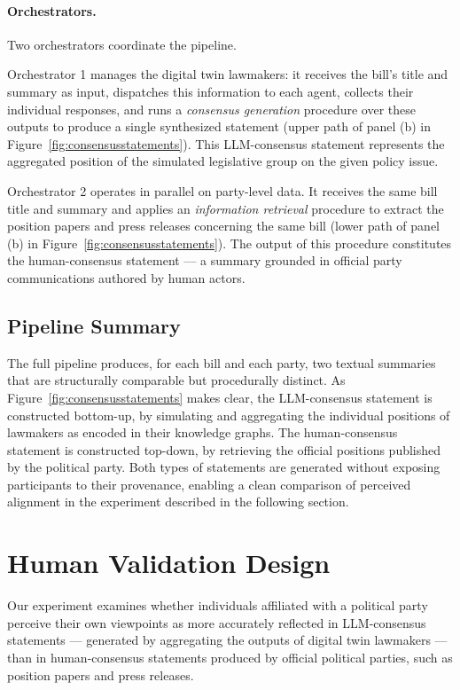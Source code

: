 \documentclass[11pt]{article}
\begin{document}
\paragraph{Orchestrators.} Two orchestrators coordinate the pipeline.

Orchestrator 1 manages the digital twin lawmakers: it receives the bill's title and summary as input, dispatches this information to each agent, collects their individual responses, and runs a \textit{consensus generation} procedure over these outputs to produce a single synthesized statement (upper path of panel (b) in Figure~\ref{fig:consensusstatements}). This LLM-consensus statement represents the aggregated position of the simulated legislative group on the given policy issue.

Orchestrator 2 operates in parallel on party-level data. It receives the same bill title and summary and applies an \textit{information retrieval} procedure to extract the position papers and press releases concerning the same bill (lower path of panel (b) in Figure~\ref{fig:consensusstatements}). The output of this procedure constitutes the human-consensus statement — a summary grounded in official party communications authored by human actors.

\subsection{Pipeline Summary}

The full pipeline produces, for each bill and each party, two textual summaries that are structurally comparable but procedurally distinct. As Figure~\ref{fig:consensusstatements} makes clear, the LLM-consensus statement is constructed bottom-up, by simulating and aggregating the individual positions of lawmakers as encoded in their knowledge graphs. The human-consensus statement is constructed top-down, by retrieving the official positions published by the political party. Both types of statements are generated without exposing participants to their provenance, enabling a clean comparison of perceived alignment in the experiment described in the following section.

\section{Human Validation Design}

Our experiment examines whether individuals affiliated with a political party perceive their own viewpoints as more accurately reflected in LLM-consensus statements — generated by aggregating the outputs of digital twin lawmakers — than in human-consensus statements produced by official political parties, such as position papers and press releases.
\end{document}
